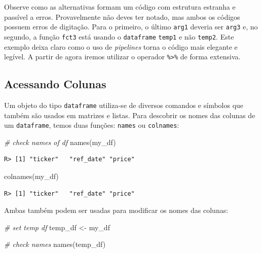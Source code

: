\documentclass[
  11pt,
]{book}
\newenvironment{Shaded}{\begin{snugshade}}{\end{snugshade}}
\newcommand{\CommentTok}[1]{\textcolor[rgb]{0.37,0.37,0.37}{\textit{#1}}}
\newcommand{\FunctionTok}[1]{\textcolor[rgb]{0,0,0}{#1}}
\newcommand{\NormalTok}[1]{#1}
\newcommand{\OtherTok}[1]{\textcolor[rgb]{0.37,0.37,0.37}{#1}}
\begin{document}
Observe como as alternativas formam um código com estrutura estranha e passível a erros. Provavelmente não deves ter notado, mas ambos os códigos possuem erros de digitação. Para o primeiro, o último \texttt{arg1} deveria ser \texttt{arg3} e, no segundo, a função \texttt{fct3} está usando o \texttt{dataframe} \texttt{temp1} e não \texttt{temp2}. Este exemplo deixa claro como o uso de \emph{pipelines} torna o código mais elegante e legível. A partir de agora iremos utilizar o operador \texttt{\%\textgreater{}\%} de forma extensiva.

\hypertarget{acessando-colunas}{%
\subsection{Acessando Colunas}\label{acessando-colunas}}

Um objeto do tipo \texttt{dataframe} utiliza-se de diversos comandos e símbolos que também são usados em matrizes e listas. Para descobrir os nomes das colunas de um \texttt{dataframe}, temos duas funções: \texttt{names} ou \texttt{colnames}:

\begin{Shaded}
\begin{Highlighting}[]
\CommentTok{\# check names of df}
\FunctionTok{names}\NormalTok{(my\_df)}
\end{Highlighting}
\end{Shaded}

\begin{verbatim}
R> [1] "ticker"   "ref_date" "price"
\end{verbatim}

\begin{Shaded}
\begin{Highlighting}[]
\FunctionTok{colnames}\NormalTok{(my\_df)}
\end{Highlighting}
\end{Shaded}

\begin{verbatim}
R> [1] "ticker"   "ref_date" "price"
\end{verbatim}

Ambas também podem ser usadas para modificar os nomes das colunas:

\begin{Shaded}
\begin{Highlighting}[]
\CommentTok{\# set temp df}
\NormalTok{temp\_df }\OtherTok{\textless{}{-}}\NormalTok{ my\_df}

\CommentTok{\# check names}
\FunctionTok{names}\NormalTok{(temp\_df)}
\end{Highlighting}
\end{Shaded}
\end{document}
